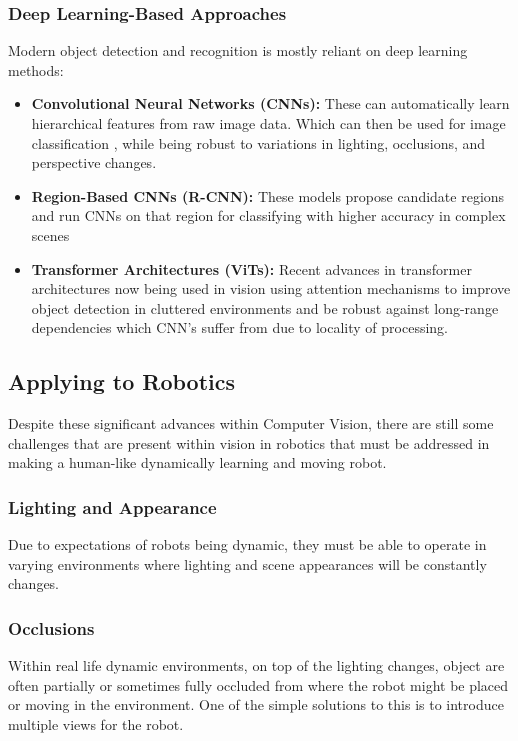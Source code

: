     \subsubsection{Deep Learning-Based Approaches}
    Modern object detection and recognition is mostly reliant on deep learning methods:
    \begin{itemize}
      \item \textbf{Convolutional Neural Networks (CNNs):} These \cite{gu2018recent,li2021survey} can automatically learn hierarchical features from raw image data. Which can then be used for image classification \cite{hijazi2015using,traore2018deep}, while being robust to variations in lighting, occlusions, and perspective changes.
      \item \textbf{Region-Based CNNs (R-CNN):} These models propose candidate regions and run CNNs on that region for classifying with higher accuracy in complex scenes \cite{bharati2020deep, girshick2015fastrcnn}
      \item \textbf{Transformer Architectures (ViTs):} Recent advances in transformer architectures \cite{bi2021transformer} now being used in vision using attention mechanisms to improve object detection in cluttered environments \cite{kayacan2024vision} and be robust against long-range dependencies which CNN's suffer from due to locality of processing.
    \end{itemize}

  \subsection{Applying to Robotics}
    Despite these significant advances within Computer Vision, there are still some challenges that are present within vision in robotics that must be addressed in making a human-like dynamically learning and moving robot.

    \subsubsection{Lighting and Appearance}
      Due to expectations of robots being dynamic, they must be able to operate in varying environments where lighting and scene appearances will be constantly changes.

    \subsubsection{Occlusions}
      Within real life dynamic environments, on top of the lighting changes, object are often partially or sometimes fully occluded from where the robot might be placed or moving in the environment.  One of the simple solutions to this is to introduce multiple views for the robot. 
      
